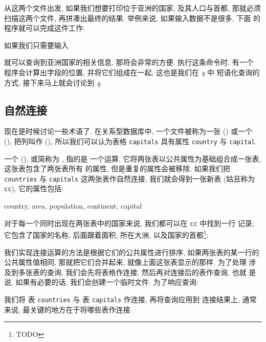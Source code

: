 从这两个文件出发, 如果我们想要打印位于亚洲的国家, 及其人口与首都, 那就必须
扫描这两个文件, 再拼凑出最终的结果. 举例来说, 如果输入数据不是很多, 下面
的程序就可以完成这件工作:

如果我们只需要输入
就可以查询到亚洲国家的相关信息, 那将会非常的方便. 执行这条命令时, 有一个
程序会计算出字段的位置, 并将它们组成在一起, 这也是我们在 \textit{q} 中
短语化查询的方式, 接下来马上就会讨论到 \textit{q}.

\subsection{自然连接}
\label{subsec:natural_joins}

现在是时候讨论一些术语了. 在关系型数据库中, 一个文件被称为一张  
() 或一个  (), 把列叫作 
(), 所以我们可以认为表格 \verb'capitals' 具有属性
\verb'country' 与 \verb'capital'.

一个  (), 或简称为 , 指的是 
一个运算, 它将两张表以公共属性为基础组合成一张表, 这张表包含了两张表所有
的属性, 但是重复的属性会被移除. 如果我们把 \verb'countries' 与
\verb'capitals' 这两张表作自然连接, 我们就会得到一张新表 (姑且称为
\verb'cc'), 它的属性包括:
\begin{file}
    country, area, population, continent, capital
\end{file}
对于每一个同时出现在两张表中的国家来说, 我们都可以在 \verb'cc' 中找到一行
记录, 它包含了国家的名称, 后面跟着面积, 所在大洲,
以及国家的首都\footnote{TODO}:
\begin{file}
\end{file}

我们实现连接运算的方法是根据它们的公共属性进行排序, 如果两张表的某一行的
公共属性值相同, 那就把它们合并起来, 就像上面这张表显示的那样. 为了处理
涉及到多张表的查询, 我们会先将表格作连接, 然后再对连接后的表作查询, 也就 
是说, 如果有必要的话, 我们会创建一个临时文件.
为了响应查询:
我们将 表 \verb'countries' 与 表 \verb'capitals'  作连接, 再将查询应用到
连接结果上, 通常来说, 最关键的地方在于将哪些表作连接.

